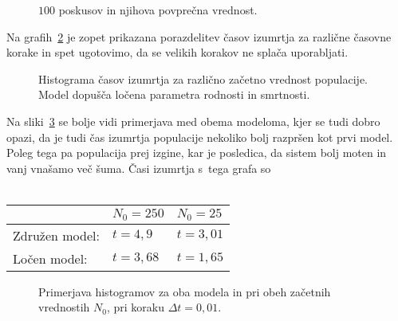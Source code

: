 \documentclass[a4paper,pdftex,11pt]{article}
\numberwithin{figure}{section} %
\begin{document}
\begin{figure}    
    \centering
    \resizebox{0.75\linewidth}{!}{}
    \caption{$100$ poskusov in njihova povprečna vrednost.}
    \label{slika5}
\end{figure}
Na grafih~\ref{slika6} je zopet prikazana porazdelitev časov izumrtja za različne
časovne korake in spet ugotovimo, da se velikih korakov ne splača uporabljati.

\begin{figure}    
    \begin{minipage}{\textwidth} 
	\centering 
	\resizebox{0.75\textwidth}{!}{} 
    \end{minipage}
    \begin{minipage}{\textwidth} 
	\centering
	\resizebox{0.75\textwidth}{!}{} 
    \end{minipage}
    \caption{Histograma časov izumrtja za različno začetno vrednost populacije. Model
    dopušča ločena parametra rodnosti in smrtnosti.}
    \label{slika6}
\end{figure}
Na sliki~\ref{slika7} se bolje vidi primerjava med obema modeloma, kjer se tudi dobro
opazi, da je tudi čas izumrtja populacije nekoliko bolj razpršen kot prvi model. Poleg
tega pa populacija prej izgine, kar je posledica, da sistem bolj moten in vanj vnašamo več
šuma. Časi izumrtja s~tega grafa so \\
\\
\begin{tabularx}{\textwidth}{ |X|X|X| }
    \hline
    $\quad$ & $N_0 = 250$ & $N_0 = 25$ \\ 
    \hline 
    Združen model: & $t = 4,9$ & $t = 3,01$ \\ 
    \hline 
    Ločen model: & $t = 3,68$ & $t = 1,65$ \\ 
    \hline
\end{tabularx}

\begin{figure}    
    \begin{minipage}{\textwidth} 
	\centering 
	\resizebox{0.75\textwidth}{!}{} 
    \end{minipage}
    \begin{minipage}{\textwidth} 
	\centering
	\resizebox{0.75\textwidth}{!}{} 
    \end{minipage}
    \caption{Primerjava histogramov za oba modela in pri obeh začetnih vrednostih $N_0$,
    pri koraku $\Delta t=0,01$.}
    \label{slika7}
\end{figure}
\pagebreak
\end{document}
